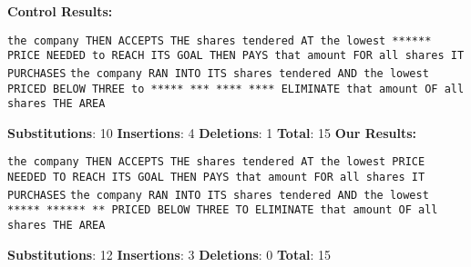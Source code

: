 \documentclass{article}
\begin{document}
\begin{flushleft}
\textbf{Control Results:}\break
\begin{tiny}
\texttt{the company THEN ACCEPTS THE shares tendered AT\hspace{2pt}  the lowest ******\hspace{.5pt} PRICE NEEDED to REACH ITS GOAL THEN PAYS\hspace{13pt}      that amount FOR all shares IT\hspace{2pt}  PURCHASES}\break
\texttt{the company RAN\hspace{2pt}  INTO\hspace{8.5pt}    ITS shares tendered AND the lowest PRICED BELOW THREE\hspace{2pt}  to ***** *** **** **** ELIMINATE that amount OF\hspace{2pt}  all shares THE AREA}\break
\end{tiny}
\textbf{Substitutions}: 10 \textbf{Insertions}: 4 \textbf{Deletions}: 1 \textbf{Total}: 15\break\break
\textbf{Our Results:}\break
\begin{tiny}
\texttt{the company THEN ACCEPTS THE shares tendered AT\hspace{2pt} the lowest PRICE NEEDED TO\hspace{1pt} REACH\hspace{2pt} ITS\hspace{5.5pt} GOAL\hspace{2pt} THEN PAYS\hspace{12pt} that amount FOR all shares IT\hspace{3pt} PURCHASES}\break
\texttt{the company RAN\hspace{2pt} INTO\hspace{8.5pt} ITS shares tendered AND the lowest ***** ****** ** PRICED BELOW THREE TO\hspace{4pt} ELIMINATE that amount OF\hspace{2pt} all shares THE AREA}\break
\end{tiny}
\textbf{Substitutions}: 12 \textbf{Insertions}: 3 \textbf{Deletions}: 0 \textbf{Total}: 15\break


\end{flushleft}
\end{document}
